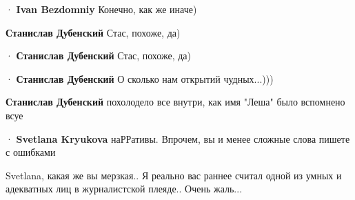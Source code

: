 \begin{itemize}
\begin{itemize}
 
  · 
\textbf{Ivan Bezdomniy}
Конечно, как же иначе)

 
\textbf{Станислав Дубенский}
Стас, похоже, да)

 
  · 
\textbf{Станислав Дубенский}
Стас, похоже, да)

 
  · 
\textbf{Станислав Дубенский}
О сколько нам открытий чудных...)))

 
\textbf{Станислав Дубенский} похолодело все внутри, как имя "Леша" было вспомнено всуе\Laughey[1.0][white]

 
  · 
\textbf{Svetlana Kryukova} наРРативы. Впрочем, вы и менее сложные слова пишете с ошибками

 
Svetlana, какая же вы мерзкая.. Я реально вас раннее считал одной из умных и адекватных лиц в журналистской плеяде.. Очень жаль...


\end{itemize}
\end{itemize}
